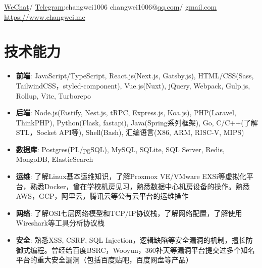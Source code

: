 \documentclass{resume}
\newcommand{\iconsection}[2]{
  \section[\texorpdfstring{#2}{#2}]{\faIcon{#1}\quad #2}
}
\begin{document}
  \sloppy


  \contactInfo
  {\href{https://www.changwei.me/_next/static/media/wechat_changwei1006.bb2a1d9a.jpg}{WeChat}/
  \href{https://t.me/changwei1006}{Telegram}:changwei1006}
  {{changwei1006@}\href{mailto:changwei1006@qq.com}{qq.com}/
  \href{mailto:changwei1006@gmail.com}{gmail.com}}
  {\href{https://www.changwei.me}{https://www.changwei.me}}{}


  \iconsection{wrench}{技术能力}
  \begin{itemize}
    \item \textbf{前端}: JavaScript/TypeScript, React.js(Next.js, Gatsby,js), HTML/CSS(Sass, TailwindCSS，styled-component), Vue.js(Nuxt), jQuery, Webpack, Gulp.js, Rollup, Vite, Turborepo
    \item \textbf{后端}: Node.js(Fastify, Nest.js, tRPC, Express.js, Koa.js), PHP(Laravel, ThinkPHP), Python(Flask, fastapi), Java(Spring系列框架), Go, C/C++(了解STL，Socket API等), Shell(Bash), 汇编语言(X86, ARM, RISC-V, MIPS)
    \item \textbf{数据库}: Postgres(PL/pgSQL), MySQL, SQLite, SQL Server, Redis, MongoDB, ElasticSearch
    \item \textbf{运维}: 了解Linux基本运维知识，了解Proxmox VE/VMware EXSi等虚拟化平台，熟悉Docker，曾在学校机房见习，熟悉数据中心机房设备的操作。熟悉AWS，GCP，阿里云，腾讯云等公有云平台的运维操作
    \item \textbf{网络}: 了解OSI七层网络模型和TCP/IP协议栈，了解网络配置，了解使用Wireshark等工具分析协议栈
    \item \textbf{安全}: 熟悉XSS, CSRF, SQL Injection，逻辑缺陷等安全漏洞的机制，擅长防御式编程。曾经给百度BSRC，Wooyun，360补天等漏洞平台提交过多个知名平台的重大安全漏洞（包括百度贴吧，百度网盘等产品）
  \end{itemize}
\end{document}
